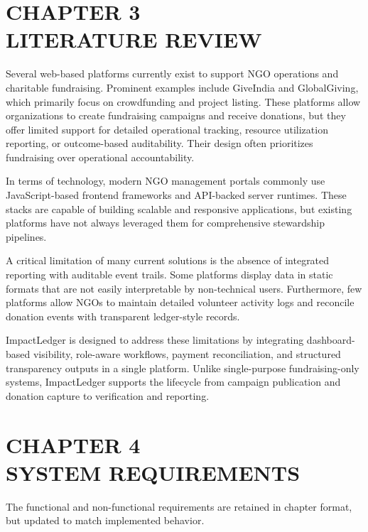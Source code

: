 \documentclass[12pt,a4paper]{article}
\begin{document}
\newpage
\section{CHAPTER 3\\LITERATURE REVIEW}
Several web-based platforms currently exist to support NGO operations and charitable fundraising. Prominent examples include GiveIndia and GlobalGiving, which primarily focus on crowdfunding and project listing. These platforms allow organizations to create fundraising campaigns and receive donations, but they offer limited support for detailed operational tracking, resource utilization reporting, or outcome-based auditability. Their design often prioritizes fundraising over operational accountability.

In terms of technology, modern NGO management portals commonly use JavaScript-based frontend frameworks and API-backed server runtimes. These stacks are capable of building scalable and responsive applications, but existing platforms have not always leveraged them for comprehensive stewardship pipelines.

A critical limitation of many current solutions is the absence of integrated reporting with auditable event trails. Some platforms display data in static formats that are not easily interpretable by non-technical users. Furthermore, few platforms allow NGOs to maintain detailed volunteer activity logs and reconcile donation events with transparent ledger-style records.

ImpactLedger is designed to address these limitations by integrating dashboard-based visibility, role-aware workflows, payment reconciliation, and structured transparency outputs in a single platform. Unlike single-purpose fundraising-only systems, ImpactLedger supports the lifecycle from campaign publication and donation capture to verification and reporting.


\newpage

\section{CHAPTER 4\\SYSTEM REQUIREMENTS}
The functional and non-functional requirements are retained in chapter format, but updated to match implemented behavior.
\end{document}
